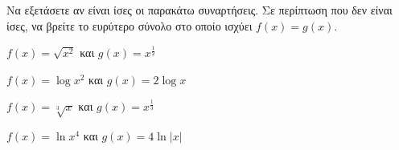 Να εξετάσετε αν είναι ίσες οι παρακάτω συναρτήσεις. Σε περίπτωση που δεν είναι ίσες, να βρείτε το ευρύτερο σύνολο στο οποίο ισχύει $ f(x)=g(x) $.
\begin{alist}
\item $ f(x)=\sqrt{x^2} $ και $ g(x)=x^{\frac{1}{2}} $
\item $ f(x)=\log{x^2} $ και $ g(x)=2\log{x} $
\item $ f(x)=\sqrt[3]{x} $ και $ g(x)=x^{\frac{1}{3}} $
\item $ f(x)=\ln{x^4} $ και $ g(x)=4\ln{|x|} $
\end{alist}
